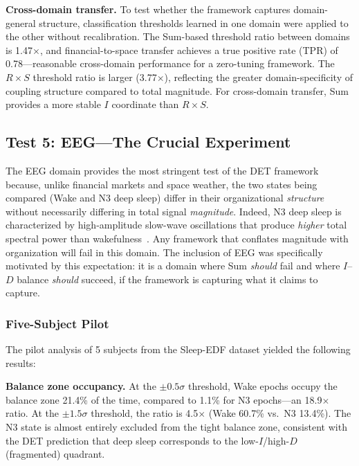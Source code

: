 \documentclass[aip,cha,reprint,amsmath,amssymb,final]{revtex4-2}
\begin{document}
\textbf{Cross-domain transfer.} To test whether the framework captures domain-general structure, classification thresholds learned in one domain were applied to the other without recalibration. The Sum-based threshold ratio between domains is 1.47$\times$, and financial-to-space transfer achieves a true positive rate (TPR) of 0.78---reasonable cross-domain performance for a zero-tuning framework. The $R \times S$ threshold ratio is larger (3.77$\times$), reflecting the greater domain-specificity of coupling structure compared to total magnitude. For cross-domain transfer, Sum provides a more stable $I$ coordinate than $R \times S$.

\subsection{\label{sec:eeg}Test 5: EEG---The Crucial Experiment}

The EEG domain provides the most stringent test of the DET framework because, unlike financial markets and space weather, the two states being compared (Wake and N3 deep sleep) differ in their organizational \emph{structure} without necessarily differing in total signal \emph{magnitude}. Indeed, N3 deep sleep is characterized by high-amplitude slow-wave oscillations that produce \emph{higher} total spectral power than wakefulness~\cite{massimini2005}. Any framework that conflates magnitude with organization will fail in this domain. The inclusion of EEG was specifically motivated by this expectation: it is a domain where Sum \emph{should} fail and where $I$--$D$ balance \emph{should} succeed, if the framework is capturing what it claims to capture.

\subsubsection{Five-Subject Pilot}

The pilot analysis of 5 subjects from the Sleep-EDF dataset yielded the following results:

\textbf{Balance zone occupancy.} At the $\pm 0.5\sigma$ threshold, Wake epochs occupy the balance zone 21.4\% of the time, compared to 1.1\% for N3 epochs---an 18.9$\times$ ratio. At the $\pm 1.5\sigma$ threshold, the ratio is 4.5$\times$ (Wake 60.7\% vs.\ N3 13.4\%). The N3 state is almost entirely excluded from the tight balance zone, consistent with the DET prediction that deep sleep corresponds to the low-$I$/high-$D$ (fragmented) quadrant.
\end{document}
